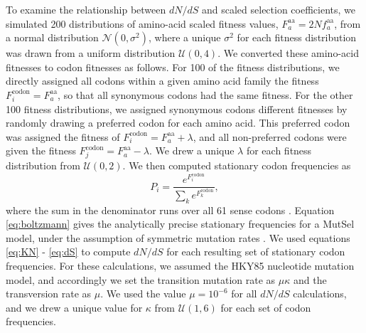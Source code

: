 \documentclass{pnastwo}
\begin{document}
\begin{article}
To examine the relationship between $dN/dS$ and scaled selection coefficients, we simulated 200 distributions of amino-acid scaled fitness values, $F^\text{aa}_a = 2Nf^\text{aa}_a$, from a normal distribution $\mathcal{N}(0,\sigma^2)$, where a unique $\sigma^2$ for each fitness distribution was drawn from a uniform distribution $\mathcal{U}(0,4)$. We converted these amino-acid fitnesses to codon fitnesses as follows. For 100 of the fitness distributions, we directly assigned all codons within a given amino acid family the fitness $F^\text{codon}_i = F^\text{aa}_a$, so that all synonymous codons had the same fitness. For the other 100 fitness distributions, we assigned synonymous codons different fitnesses by randomly drawing a preferred codon for each amino acid. This preferred codon was assigned the fitness of $F^\text{codon}_i = F^\text{aa}_a + \lambda$, and all non-preferred codons were given the fitness $F^\text{codon}_j = F^\text{aa}_a - \lambda$. We drew a unique $\lambda$ for each fitness distribution from $\mathcal{U}(0,2)$. 
We then computed stationary codon frequencies as 
\begin{equation}\label{eq:boltzmann}
P_i = \frac{e^{F^\text{codon}_i}}{\sum_k e^{F^\text{codon}_k}}, 
\end{equation} where the sum in the denominator runs over all 61 sense codons \cite{SellaHirsh2005}. Equation \eqref{eq:boltzmann} gives the analytically precise stationary frequencies for a MutSel model, under the assumption of symmetric mutation rates \cite{SellaHirsh2005}. We used equations \eqref{eq:KN} - \eqref{eq:dS} to compute $dN/dS$ for each resulting set of stationary codon frequencies. For these calculations, we assumed the HKY85 \cite{HKY85} nucleotide mutation model, and accordingly we set the transition mutation rate as $\mu\kappa$ and the transversion rate as $\mu$. We used the value $\mu = 10^{-6}$ for all $dN/dS$ calculations, and we drew a unique value for $\kappa$ from $\mathcal{U}(1,6)$ for each set of codon frequencies.



\end{article}
\end{document}
